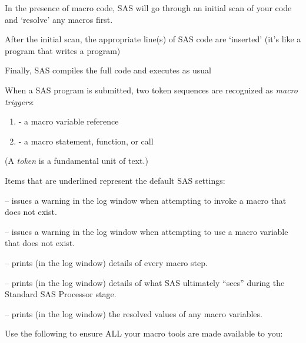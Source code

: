 \begin{frame}
\bi
\item In the presence of macro code, SAS will go through an initial scan of your code and `resolve' any macros first.
\item After the initial scan, the appropriate line(s) of SAS code are `inserted' (it's like a program that writes a program)
\item Finally, SAS compiles the full code and executes as usual
\ei
\end{frame}

\begin{frame}
When a SAS program is submitted, two token sequences are recognized as \emph{macro triggers}: \\
\vskip15pt
\begin{enumerate}
    \item {} - a macro variable reference
    \item {} - a macro statement, function, or call
\end{enumerate}
\vskip15pt
(A \emph{token} is a fundamental unit of text.)
\end{frame}


\begin{frame}
Items that are underlined represent the default SAS settings:
\bi
\small{
\item {} -- issues a warning in the log window when attempting to invoke a macro that does not exist.
\item {} -- issues a warning in the log window when attempting to use a macro variable that does not exist.
\item {} -- prints (in the log window) details of every macro step.
\item {} -- prints (in the log window) details of what SAS ultimately ``sees'' during the Standard SAS Processor stage.
\item {} -- prints (in the log window) the resolved values of any macro variables. }
\ei
Use the following to ensure ALL your macro tools are made available to you:
\hspace{1.5in}
\end{frame}


